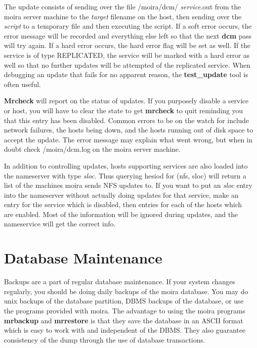 \documentclass{book}
\begin{document}
The update consists of sending over the file /moira/dcm/{\em
service}.out from the moira server machine to the {\em target}
filename on the host, then sending over the {\em script} to a
temporary file and then executing the script.  If a soft error occurs,
the error message will be recorded and everything else left so that
the next {\bf dcm} pass will try again.  If a hard error occurs, the
hard error flag will be set as well.  If the service is of type
REPLICATED, the service will be marked with a hard error as well so
that no further updates will be attempted of the replicated service.
When debugging an update that fails for no apparent reason, the {\bf
test\_update} tool is often useful.

{\bf Mrcheck} will report on the status of updates.  If you purposely
disable a service or host, you will have to clear the state to get
{\bf mrcheck} to quit reminding you that this entry has been disabled.
Common errors to be on the watch for include network failures, the
hosts being down, and the hosts running out of disk space to accept
the update.  The error message may explain what went wrong, but when
in doubt check /moira/dcm.log on the moira server machine.

In addition to controlling updates, hosts supporting services are also
loaded into the nameserver with type {\em sloc}.  Thus querying hesiod
for (nfs, sloc) will return a list of the machines moira sends NFS
updates to.  If you want to put an {\em sloc} entry into the nameserver
without actually doing updates for that service, make an entry for the
service which is disabled, then entries for each of the hosts which
are enabled.  Most of the information will be ignored during updates,
and the nameservice will get the correct info.


\section{Database Maintenance}

Backups are a part of regular database maintenance.  If your system
changes regularly, you should be doing daily backups of the moira
database.  You may do {\sc unix} backups of the database partition, DBMS
backups of the database, or use the programs provided with moira.  The
advantage to using the moira programs {\bf mrbackup} and {\bf mrrestore}
is that they save the database in an ASCII format which is easy to
work with and independent of the DBMS.  They also guarantee
consistency of the dump through the use of database transactions.
\end{document}

